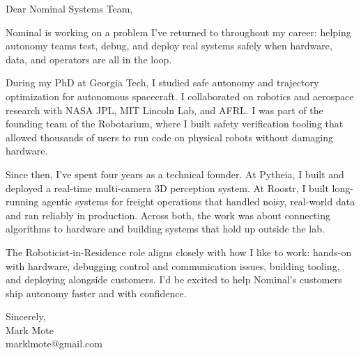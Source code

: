 \documentclass[11pt]{article}
\begin{document}
\noindent Dear Nominal Systems Team,

Nominal is working on a problem I’ve returned to throughout my career: helping autonomy teams test, debug, and deploy real systems safely when hardware, data, and operators are all in the loop.

During my PhD at Georgia Tech, I studied safe autonomy and trajectory optimization for autonomous spacecraft. I collaborated on robotics and aerospace research with NASA JPL, MIT Lincoln Lab, and AFRL. I was part of the founding team of the Robotarium, where I built safety verification tooling that allowed thousands of users to run code on physical robots without damaging hardware.

Since then, I’ve spent four years as a technical founder. At Pytheia, I built and deployed a real-time multi-camera 3D perception system. At Roostr, I built long-running agentic systems for freight operations that handled noisy, real-world data and ran reliably in production. Across both, the work was about connecting algorithms to hardware and building systems that hold up outside the lab.

The Roboticist-in-Residence role aligns closely with how I like to work: hands-on with hardware, debugging control and communication issues, building tooling, and deploying alongside customers. I’d be excited to help Nominal’s customers ship autonomy faster and with confidence.

\vspace{1em}
\noindent Sincerely,\\
Mark Mote\\
marklmote@gmail.com
\end{document}

